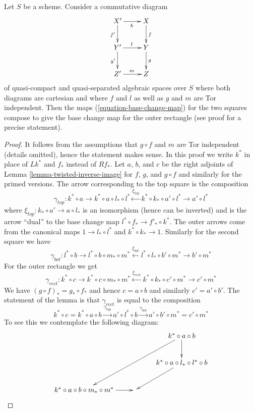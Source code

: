 \begin{lemma}
\label{lemma-compose-base-change-maps}
Let $S$ be a scheme. Consider a commutative diagram
$$
\xymatrix{
X' \ar[r]_k \ar[d]_{f'} & X \ar[d]^f \\
Y' \ar[r]^l \ar[d]_{g'} & Y \ar[d]^g \\
Z' \ar[r]^m & Z
}
$$
of quasi-compact and quasi-separated algebraic spaces over $S$ where
both diagrams are cartesian and where $f$ and $l$
as well as $g$ and $m$ are Tor independent.
Then the maps (\ref{equation-base-change-map})
for the two squares compose to give the base
change map for the outer rectangle (see proof for a precise statement).
\end{lemma}

\begin{proof}
It follows from the assumptions that $g \circ f$ and $m$ are Tor
independent (details omitted), hence the statement makes sense.
In this proof we write $k^*$ in place of $Lk^*$ and $f_*$ instead
of $Rf_*$. Let $a$, $b$, and $c$ be the right adjoints of
Lemma \ref{lemma-twisted-inverse-image}
for $f$, $g$, and $g \circ f$ and similarly for the primed versions.
The arrow corresponding to the top square is the composition
$$
\gamma_{top} :
k^* \circ a \to k^* \circ a \circ l_* \circ l^*
\xleftarrow{\xi_{top}} k^* \circ k_* \circ a' \circ l^* \to a' \circ l^*
$$
where $\xi_{top} : k_* \circ a' \to a \circ l_*$
is an isomorphism (hence can be inverted)
and is the arrow ``dual'' to the base change map
$l^* \circ f_* \to f'_* \circ k^*$. The outer arrows come
from the canonical maps $1 \to l_* \circ l^*$ and $k^* \circ k_* \to 1$.
Similarly for the second square we have
$$
\gamma_{bot} :
l^* \circ b \to l^* \circ b \circ m_* \circ m^*
\xleftarrow{\xi_{bot}} l^* \circ l_* \circ b' \circ m^* \to b' \circ m^*
$$
For the outer rectangle we get
$$
\gamma_{rect} :
k^* \circ c \to k^* \circ c \circ m_* \circ m^*
\xleftarrow{\xi_{rect}} k^* \circ k_* \circ c' \circ m^* \to c' \circ m^*
$$
We have $(g \circ f)_* = g_* \circ f_*$ and hence
$c = a \circ b$ and similarly $c' = a' \circ b'$.
The statement of the lemma is that $\gamma_{rect}$
is equal to the composition
$$
k^* \circ c = k^* \circ a \circ b \xrightarrow{\gamma_{top}}
a' \circ l^* \circ b \xrightarrow{\gamma_{bot}}
a' \circ b' \circ m^* = c' \circ m^*
$$
To see this we contemplate the following diagram:
$$
\xymatrix{
& & k^* \circ a \circ b \ar[d] \ar[lldd] \\
& & k^* \circ a \circ l_* \circ l^* \circ b \ar[ld] \\
k^* \circ a \circ b \circ m_* \circ m^* \ar[r] &
}$$
\end{proof}
